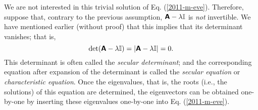 We are not interested in this trivial solution of Eq. (\ref{2011-m-eve}).
Therefore, suppose that, contrary to the previous assumption,
$\textsf{\textbf{A}} - \lambda {\Bbb I}$ is {\em not} invertible.
We have mentioned earlier (without proof) that this implies that its determinant vanishes; that is,
\begin{equation}
\textrm{det} (\textsf{\textbf{A}} - \lambda {\Bbb I}) = \vert \textsf{\textbf{A}} - \lambda {\Bbb I}\vert =0.
\label{2014-m-eve-ce}
\end{equation}
This determinant is often called the {\em secular determinant};
and the corresponding equation after expansion of the determinant is called the
{\em secular equation}
or {\em characteristic equation}.
Once the eigenvalues, that is, the roots (i.e., the solutions) of this equation are determined,
the eigenvectors can be obtained one-by-one by inserting these eigenvalues one-by-one into Eq. (\ref{2011-m-eve}).


